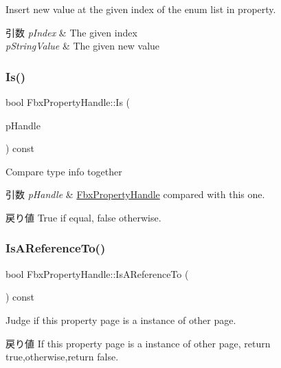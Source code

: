 Insert new value at the given index of the enum list in property. 
\begin{DoxyParams}{引数}
{\em p\+Index} & The given index \\
\hline
{\em p\+String\+Value} & The given new value \\
\hline
\end{DoxyParams}
\mbox{\label{class_fbx_property_handle_ab709acfb7bc25ce784c4453b3004a730}} 
\subsubsection{\texorpdfstring{Is()}{Is()}}
{\footnotesize\ttfamily bool Fbx\+Property\+Handle\+::\+Is (\begin{DoxyParamCaption}\item[{const \hyperlink{class_fbx_property_handle}{Fbx\+Property\+Handle} \&}]{p\+Handle }\end{DoxyParamCaption}) const}

Compare type info together 
\begin{DoxyParams}{引数}
{\em p\+Handle} & \hyperlink{class_fbx_property_handle}{Fbx\+Property\+Handle} compared with this one. \\
\hline
\end{DoxyParams}
\begin{DoxyReturn}{戻り値}
{\ttfamily True} if equal, {\ttfamily false} otherwise. 
\end{DoxyReturn}
\mbox{\label{class_fbx_property_handle_ae33624da8a0ccfd5bb44a5f12f6f0a81}} 
\subsubsection{\texorpdfstring{Is\+A\+Reference\+To()}{IsAReferenceTo()}}
{\footnotesize\ttfamily bool Fbx\+Property\+Handle\+::\+Is\+A\+Reference\+To (\begin{DoxyParamCaption}\item[{void}]{ }\end{DoxyParamCaption}) const}

Judge if this property page is a instance of other page. \begin{DoxyReturn}{戻り値}
If this property page is a instance of other page, return true,otherwise,return false. 
\end{DoxyReturn}
\mbox{\label{class_fbx_property_handle_a8181cf2b414e45cb3fd0cdef8d60fb33}} 

